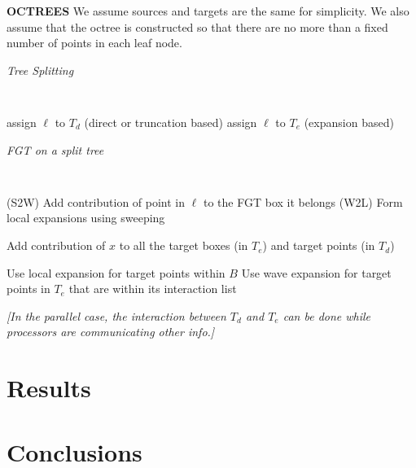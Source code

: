\documentclass[conference]{IEEEtran}
\begin{document}
%

{\bf OCTREES}
We assume sources and targets are the same for simplicity. We also assume that the octree is constructed so that there are no more than a fixed number of points in each leaf node. 

\begin{algorithm}[!h]
\caption{{\em Tree Splitting}}
{\tt
\begin{algorithmic}
\STATE
      \IF {$|\ell| > \sqrt{\delta}$}
          \STATE assign $\ell$ to $T_d$ (direct or truncation based)
      \ELSE
          \STATE assign $\ell$ to $T_e$ (expansion based)
      \ENDIF
  \ENDFOR
\STATE
\end{algorithmic}
}
\end{algorithm}


\begin{algorithm}[!h]
\caption{\em FGT on a split tree}
{\tt
\begin{algorithmic}
\STATE
      \STATE (S2W) Add contribution of point in $\ell$ to the FGT box it belongs
  \ENDFOR
  \STATE
  \STATE (W2L) Form local expansions using sweeping
  \STATE 

          \STATE Add contribution of $x$ to all the target boxes (in $T_e$) and target points (in $T_d$)     
       \ENDFOR  
  \ENDFOR
  
  \STATE 
        \STATE Use local expansion for target points within $B$ 
        \STATE
        \STATE Use wave expansion for target points in $T_e$ that are within its interaction list
     \ENDFOR  
\STATE
\end{algorithmic}
}
\end{algorithm}

{\em [In the parallel case, the interaction between $T_d$ and $T_e$ can be done while processors are communicating other info.] }



\section{Results}
\label{sc:results}




\section{Conclusions}
\end{document}
